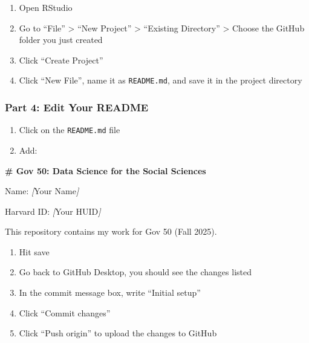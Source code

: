 \documentclass[
  11pt,
  letterpaper]{article}
\newenvironment{Shaded}{\begin{snugshade}}{\end{snugshade}}
\newcommand{\CommentTok}[1]{\textcolor[rgb]{0.56,0.35,0.01}{\textit{#1}}}
\newcommand{\FunctionTok}[1]{\textcolor[rgb]{0.13,0.29,0.53}{\textbf{#1}}}
\newcommand{\NormalTok}[1]{#1}
\newcommand{\OtherTok}[1]{\textcolor[rgb]{0.56,0.35,0.01}{#1}}
\providecommand{\tightlist}{%
  \setlength{\itemsep}{0pt}\setlength{\parskip}{0pt}}
\begin{document}
\begin{enumerate}
\def\labelenumi{\arabic{enumi}.}
\tightlist
\item
  Open RStudio
\item
  Go to ``File'' \textgreater{} ``New Project'' \textgreater{}
  ``Existing Directory'' \textgreater{} Choose the GitHub folder you
  just created
\item
  Click ``Create Project''
\item
  Click ``New File'', name it as \texttt{README.md}, and save it in the
  project directory
\end{enumerate}

\subsubsection{Part 4: Edit Your README}\label{part-4-edit-your-readme}

\begin{enumerate}
\def\labelenumi{\arabic{enumi}.}
\tightlist
\item
  Click on the \texttt{README.md} file
\item
  Add:
\end{enumerate}

\begin{Shaded}
\begin{Highlighting}[]
\FunctionTok{\# Gov 50: Data Science for the Social Sciences}

\NormalTok{Name: }\CommentTok{[}\OtherTok{Your Name}\CommentTok{]}

\NormalTok{Harvard ID: }\CommentTok{[}\OtherTok{Your HUID}\CommentTok{]}

\NormalTok{This repository contains my work for Gov 50 (Fall 2025).}
\end{Highlighting}
\end{Shaded}

\begin{enumerate}
\def\labelenumi{\arabic{enumi}.}
\setcounter{enumi}{2}
\tightlist
\item
  Hit save
\item
  Go back to GitHub Desktop, you should see the changes listed
\item
  In the commit message box, write ``Initial setup''
\item
  Click ``Commit changes''
\item
  Click ``Push origin'' to upload the changes to GitHub
\end{enumerate}
\end{document}
